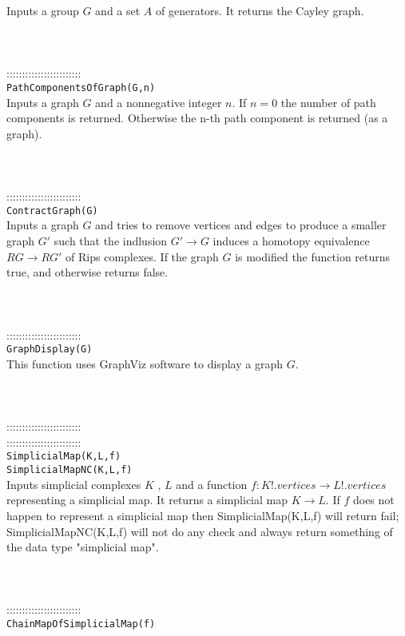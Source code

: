 \documentclass[a4paper,11pt]{report}
\begin{document}
{ Inputs a group $G$ and a set $A$ of generators. It returns the Cayley graph. \\
 \\
 \\
 \\
 ::::::::::::::::::::::::\\
 \texttt{PathComponentsOfGraph(G,n)}\\
 

 Inputs a graph $G$ and a nonnegative integer $n$. If $n=0$ the number of path components is returned. Otherwise the n-th path component
is returned (as a graph). \\
 \\
 \\
 \\
 ::::::::::::::::::::::::\\
 \texttt{ContractGraph(G)}\\
 

 Inputs a graph $G$ and tries to remove vertices and edges to produce a smaller graph $G'$ such that the indlusion $G' \rightarrow G$ induces a homotopy equivalence $RG \rightarrow RG'$ of Rips complexes. If the graph $G$ is modified the function returns true, and otherwise returns false. \\
 \\
 \\
 \\
 ::::::::::::::::::::::::\\
 \texttt{GraphDisplay(G)}\\
 

 This function uses GraphViz software to display a graph $G$. \\
 \\
 \\
 \\
 ::::::::::::::::::::::::\\
 ::::::::::::::::::::::::\\
 \texttt{SimplicialMap(K,L,f)}\\
 \texttt{SimplicialMapNC(K,L,f)}\\
 

 Inputs simplicial complexes $K$ , $L$ and a function $f\colon K!.vertices \rightarrow L!.vertices$ representing a simplicial map. It returns a simplicial map $K \rightarrow L$. If $f$ does not happen to represent a simplicial map then SimplicialMap(K,L,f) will
return fail; SimplicialMapNC(K,L,f) will not do any check and always return
something of the data type "simplicial map". \\
 \\
 \\
 \\
 ::::::::::::::::::::::::\\
 \texttt{ChainMapOfSimplicialMap(f)}\\
 

}
\end{document}
